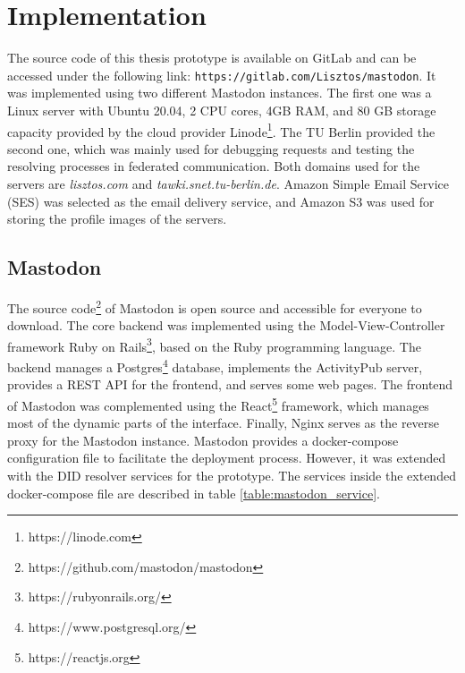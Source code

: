 \chapter{Implementation}
\label{cha:implementation}

The source code of this thesis prototype is available on GitLab and can be accessed under the following link: \verb|https://gitlab.com/Lisztos/mastodon|. It was implemented using two different Mastodon instances. The first one was a Linux server with Ubuntu 20.04, 2 CPU cores,  4GB RAM, and 80 GB storage capacity provided by the cloud provider Linode\footnote{https://linode.com}. The TU Berlin provided the second one, which was mainly used for debugging requests and testing the resolving processes in federated communication. Both domains used for the servers are \emph{lisztos.com} and \emph{tawki.snet.tu-berlin.de}. Amazon Simple Email Service (SES) was selected as the email delivery service, and Amazon S3 was used for storing the profile images of the servers. 

\section{Mastodon}

The source code\footnote{https://github.com/mastodon/mastodon} of Mastodon is open source and accessible for everyone to download. The core backend was implemented using the Model-View-Controller framework Ruby on Rails\footnote{https://rubyonrails.org/}, based on the Ruby programming language. The backend manages a Postgres\footnote{https://www.postgresql.org/} database, implements the ActivityPub server, provides a REST API for the frontend, and serves some web pages. The frontend of Mastodon was complemented using the React\footnote{https://reactjs.org} framework, which manages most of the dynamic parts of the interface. Finally, Nginx serves as the reverse proxy for the Mastodon instance.  
Mastodon provides a docker-compose configuration file to facilitate the deployment process. However, it was extended with the DID resolver services for the prototype. The services inside the extended docker-compose file are described in table \ref{table:mastodon_service}.

